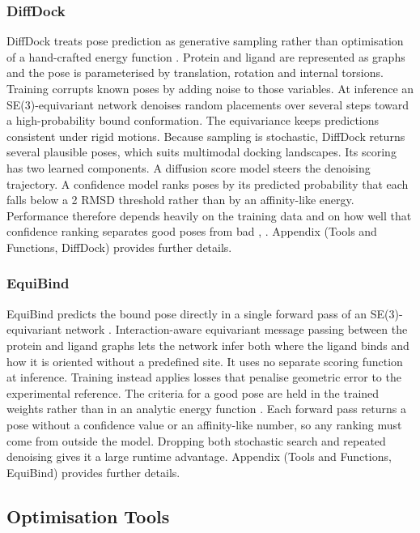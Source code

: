 \hypertarget{diffdock}{%
\subsubsection{DiffDock}\label{diffdock}}

DiffDock treats pose prediction as generative sampling rather than optimisation of a hand-crafted energy function \cite{ref024}. Protein and ligand are represented as graphs and the pose is parameterised by translation, rotation and internal torsions. Training corrupts known poses by adding noise to those variables. At inference an SE(3)-equivariant network denoises random placements over several steps toward a high-probability bound conformation. The equivariance keeps predictions consistent under rigid motions. Because sampling is stochastic, DiffDock returns several plausible poses, which suits multimodal docking landscapes. Its scoring has two learned components. A diffusion score model steers the denoising trajectory. A confidence model ranks poses by its predicted probability that each falls below a 2\angstrom{} RMSD threshold rather than by an affinity-like energy. Performance therefore depends heavily on the training data and on how well that confidence ranking separates good poses from bad \cite{ref024}, \cite{ref091}. Appendix (Tools and Functions, DiffDock) provides further details. 

\hypertarget{equibind}{%
\subsubsection{EquiBind}\label{equibind}}

EquiBind predicts the bound pose directly in a single forward pass of an SE(3)-equivariant network \cite{ref010}. Interaction-aware equivariant message passing between the protein and ligand graphs lets the network infer both where the ligand binds and how it is oriented without a predefined site. It uses no separate scoring function at inference. Training instead applies losses that penalise geometric error to the experimental reference. The criteria for a good pose are held in the trained weights rather than in an analytic energy function \cite{ref010}. Each forward pass returns a pose without a confidence value or an affinity-like number, so any ranking must come from outside the model. Dropping both stochastic search and repeated denoising gives it a large runtime advantage. Appendix (Tools and Functions, EquiBind) provides further details.

\hypertarget{optimization-tools}{%
\subsection{Optimisation Tools}\label{optimization-tools}}

